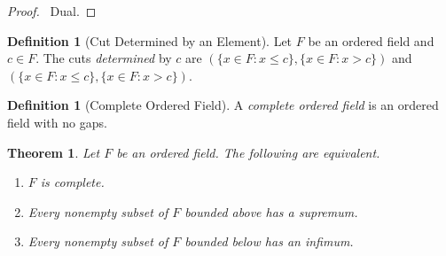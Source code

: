 \documentclass{article}
\let\qed\relax
\newtheorem{theorem}[axiom]{Theorem}
\theoremstyle{definition}
\newtheorem{definition}[axiom]{Definition}
\begin{document}
    \begin{proof}
        \pf\ Dual. \qed
    \end{proof}

    \begin{definition}[Cut Determined by an Element]
        Let $F$ be an ordered field and $c \in F$. The cuts \emph{determined} by $c$ are
        $(\{ x \in F : x \leq c \}, \{ x \in F : x > c \})$ and $(\{ x \in F : x \leq c \}, \{ x \in F : x > c \})$.
    \end{definition}

    \begin{definition}[Complete Ordered Field]
        A \emph{complete ordered field} is an ordered field with no gaps.
    \end{definition}

    \begin{theorem}
        Let $F$ be an ordered field. The following are equivalent.
        \begin{enumerate}
            \item $F$ is complete.
            \item Every nonempty subset of $F$ bounded above has a supremum.
            \item Every nonempty subset of $F$ bounded below has an infimum.
        \end{enumerate}
    \end{theorem}
\end{document}
